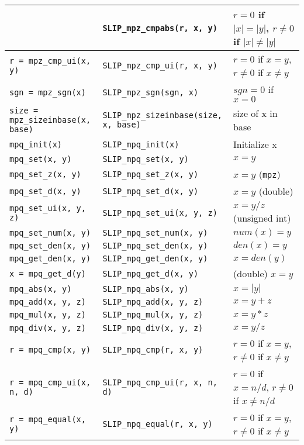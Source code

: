 \documentclass[12pt]{article}
\theoremstyle{definition}
\begin{document}
{\begin{center}
\begin{tabular}{|l|l|l|}
    & \verb|SLIP_mpz_cmpabs(r, x, y)|
    & $r = 0$ if $|x|=|y|$,  $r\neq 0$  if $|x|\neq |y|$\\ \hline
\verb|r = mpz_cmp_ui(x, y)|
    & \verb|SLIP_mpz_cmp_ui(r, x, y)|
    & $r = 0$ if $x=y$,  $r\neq 0$  if $x\neq y$ \\ \hline
\verb|sgn = mpz_sgn(x)|
    & \verb|SLIP_mpz_sgn(sgn, x)|
    & $sgn = 0$ if $x = 0$ \\ \hline
\verb|size = mpz_sizeinbase(x, base)|
    & \verb|SLIP_mpz_sizeinbase(size, x, base)|
    & size of x in base \\ \hline
\verb|mpq_init(x)|
    & \verb|SLIP_mpq_init(x)|
    & Initialize x \\ \hline
\verb|mpq_set(x, y)|
    & \verb|SLIP_mpq_set(x, y)|
    & $x = y$ \\ \hline
\verb|mpq_set_z(x, y)|
    & \verb|SLIP_mpq_set_z(x, y)|
    & $x = y$ (\verb|mpz|) \\ \hline
\verb|mpq_set_d(x, y)|
    & \verb|SLIP_mpq_set_d(x, y)|
    & $x=y$ (double) \\ \hline
\verb|mpq_set_ui(x, y, z)|
    & \verb|SLIP_mpq_set_ui(x, y, z)|
    & $x = y/z$ (unsigned int) \\ \hline
\verb|mpq_set_num(x, y)|
    & \verb|SLIP_mpq_set_num(x, y)|
    & $num(x) = y$ \\ \hline
\verb|mpq_set_den(x, y)|
    & \verb|SLIP_mpq_set_den(x, y)|
    & $den(x) = y$ \\ \hline
\verb|mpq_get_den(x, y)|
    & \verb|SLIP_mpq_get_den(x, y)|
    & $x = den(y)$ \\ \hline
\verb|x = mpq_get_d(y)|
    & \verb|SLIP_mpq_get_d(x, y)|
    & (double) $x = y$ \\ \hline
\verb|mpq_abs(x, y)|
    & \verb|SLIP_mpq_abs(x, y)|
    & $x = |y|$ \\ \hline
\verb|mpq_add(x, y, z)|
    & \verb|SLIP_mpq_add(x, y, z)|
    & $x = y+z$ \\ \hline
\verb|mpq_mul(x, y, z)|
    & \verb|SLIP_mpq_mul(x, y, z)|
    & $x = y*z$ \\ \hline
\verb|mpq_div(x, y, z)|
    & \verb|SLIP_mpq_div(x, y, z)|
    & $x = y/z$ \\ \hline
\verb|r = mpq_cmp(x, y)|
    & \verb|SLIP_mpq_cmp(r, x, y)|
    & $r = 0$ if $x=y$,  $r\neq 0$ if $x\neq y$ \\ \hline
\verb|r = mpq_cmp_ui(x, n, d)|
    & \verb|SLIP_mpq_cmp_ui(r, x, n, d)|
    & $r = 0$ if $x=n/d$, $r\neq 0$ if $x\neq n/d$ \\ \hline
\verb|r = mpq_equal(x, y)|
    & \verb|SLIP_mpq_equal(r, x, y)|
    & $r = 0$ if $x=y$,  $r\neq 0$ if $x\neq y$ \\ \hline
\end{tabular}
\end{center}
}
\end{document}
